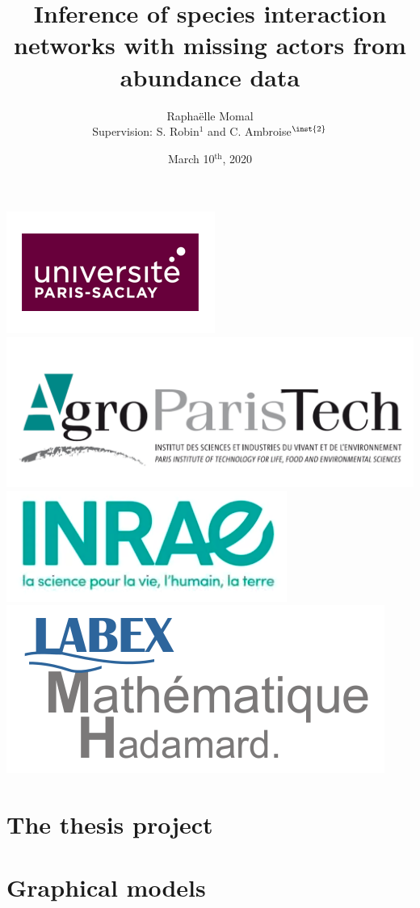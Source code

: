 \documentclass[11pt]{beamer}
\title{Inference of species interaction networks with missing actors from abundance data}
\author{Raphaëlle Momal\\
\tiny{Supervision:  S. Robin$^{{1}}$ and C. Ambroise$^{\inst{2}}$  }}
\institute[]
{
  \inst{1}%
  UMR AgroParisTech / INRA MIA-Paris \\
  \inst{2}%
  LaMME, Evry
  }
\date{March 10$^{\text{th}}$, 2020}
\begin{document}
\begin{frame}
    \titlepage
    \begin{center}
    \includegraphics[width=0.15\linewidth]{images/UPsaclay.png}
    \includegraphics[width=0.2\linewidth]{images/agro.PNG}\hspace{0.1cm}
	\includegraphics[width=0.15\linewidth]{images/inrae.png}\hspace{0.15cm}
	\includegraphics[width=0.17\linewidth]{images/lmh.png}\hspace{0.15cm}
\end{center}
\end{frame}

\section{The thesis project}


\section{Graphical models}
\end{document}
